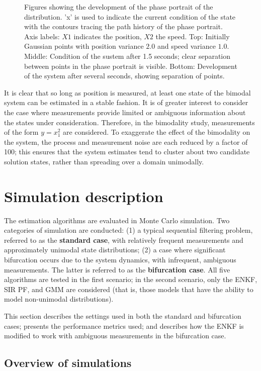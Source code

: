 \documentclass[]{article}
\begin{document}
\begin{figure}[p!]
\caption{Figures showing the development of the phase portrait of the distribution. 'x' is used to indicate the current condition of the state with the contours tracing the path history of the phase portrait. Axis labels: $X1$ indicates the position, $X2$ the speed. Top: Initially Gaussian points with position variance $2.0$ and speed variance $1.0$. Middle: Condition of the sustem after 1.5 seconds; clear separation between points in the phase portrait is visible. Bottom: Development of the system after several seconds, showing separation of points.}
\label{fig:bifurcation_animate_1}
\end{figure}

It is clear that so long as position is measured, at least one state of the bimodal system can be estimated in a stable fashion. It is of greater interest to consider the case where measurements provide limited or ambiguous information about the states under consideration. Therefore, in the bimodality study, measurements of the form $y = x_1^2$ are considered. To exaggerate the effect of the bimodality on the system, the process and measurement noise are each reduced by a factor of 100; this ensures that the system estimates tend to cluster about two candidate solution states, rather than spreading over a domain unimodally.

\section{Simulation description}

The estimation algorithms are evaluated in Monte Carlo simulation. Two categories of simulation are conducted: (1) a typical sequential filtering problem, referred to as the \textbf{standard case}, with relatively frequent measurements and approximately unimodal state distributions; (2) a case where significant bifurcation occurs due to the system dynamics, with infrequent, ambiguous measurements. The latter is referred to as the \textbf{bifurcation case}. All five algorithms are tested in the first scenario; in the second scenario, only the ENKF, SIR PF, and GMM are considered (that is, those models that have the ability to model non-unimodal distributions).

This section describes the settings used in both the standard and bifurcation cases; presents the performance metrics used; and describes how the ENKF is modified to work with ambiguous measurements in the bifurcation case.

\subsection{Overview of simulations}
\end{document}
